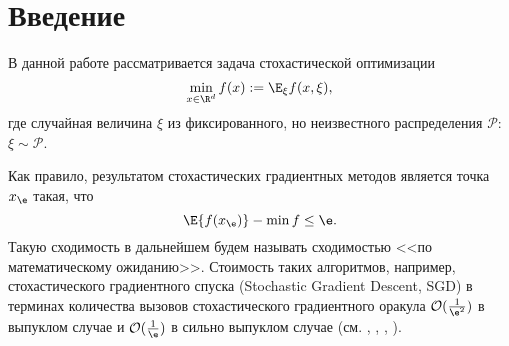 	\vfill
	\hspace{0pt}
	
	\newpage
	
	
	\section{Введение}\label{Intro}
	
	В данной работе рассматривается задача стохастической оптимизации 
    \begin{equation} \label{min_problem}
    \min_{x \in \R^d} f(x) := \E_{\xi}{f(x, \xi)},  
    \end{equation}
     где случайная величина $\xi$ из фиксированного, но неизвестного распределения $\mathcal{P}$: $\xi \sim \mathcal{P}$. 
     
     Как правило, результатом стохастических градиентных методов является точка $x_{\e}$ такая, что 
    \begin{equation} \label{expectation_conv}
   \E{f(x_{\e})} - \min f \le \e.  
    \end{equation}
Такую сходимость в дальнейшем будем называть сходимостью <<по математическому ожиданию>>. Стоимость таких алгоритмов, например, стохастического градиентного спуска (Stochastic Gradient Descent, SGD) в терминах количества вызовов стохастического градиентного оракула $\mathcal{O} (\frac{1}{\e^2})$ в выпуклом случае и $\mathcal{O} (\frac{1}{\e})$ в сильно выпуклом случае (см. \cite{nemirovskij1983problem}, \cite{polyak1992acceleration}, \cite{ghadimi2013optimal}, \cite{hazan2014beyond}).

